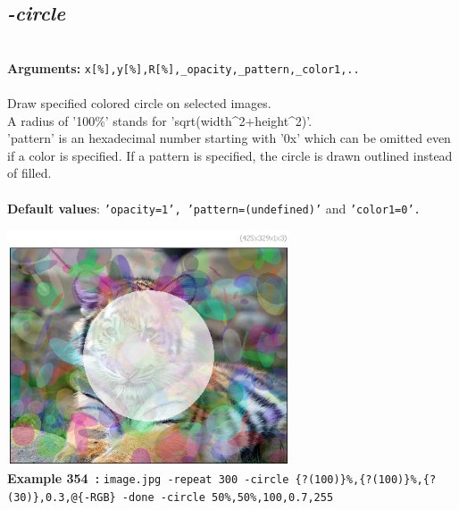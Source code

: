 \documentclass[a4paper,11pt,twoside]{book}
\begin{document}
\subsection{\emph{-circle} }\vspace*{-0.5em}
~\\\textbf{Arguments: } 
{\small \texttt{x[\%],y[\%],R[\%],\_opacity,\_pattern,\_color1,..}}\\~\\
Draw specified colored circle on selected images.
~\\A radius of '100\%' stands for 'sqrt(width\textasciicircum 2+height\textasciicircum 2)'.
~\\'pattern' is an hexadecimal number starting with '0x' which can be omitted
even if a color is specified. If a pattern is specified, the circle is
drawn outlined instead of filled.
~\\~\\\textbf{Default values}: {\small \texttt{'opacity=1', 'pattern=(undefined)'} and \texttt{'color1=0'.}}
\begin{center}\includegraphics[keepaspectratio=true,height=7cm,width=\textwidth]{img/gmic_def354.jpg}\\
{\footnotesize \textbf{Example 354~:} \texttt{image.jpg -repeat 300 -circle \{?(100)\}\%,\{?(100)\}\%,\{?(30)\},0.3,@\{-RGB\} -done -circle 50\%,50\%,100,0.7,255}}
\end{center}
\end{document}
